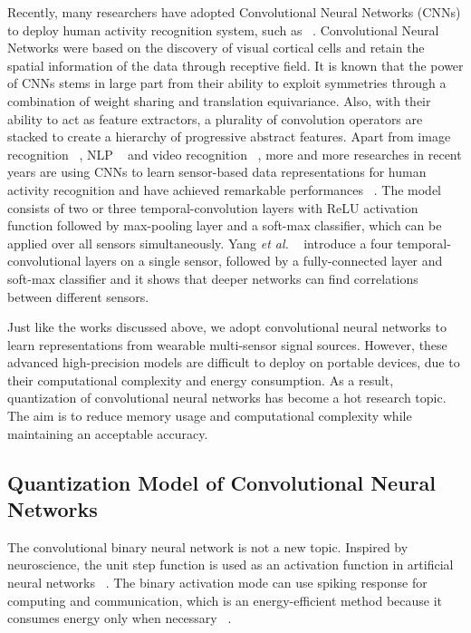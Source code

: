 \documentclass[twoside,twocolumn]{article}
\begin{document}
Recently, many researchers have adopted Convolutional Neural Networks (CNNs) to deploy human activity recognition system, such as ~\cite{b6,b22,b26,b27,b28}. Convolutional Neural Networks were based on the discovery of visual cortical cells and retain the spatial information of the data through receptive field. It is known that the power of CNNs stems in large part from their ability to exploit symmetries through a combination of weight sharing and translation equivariance. Also, with their ability to act as feature extractors, a plurality of convolution operators are stacked to create a hierarchy of progressive abstract features. Apart from image recognition ~\cite{b12,b29,b30}, NLP ~\cite{b31,b32} and video recognition ~\cite{b33}, more and more researches in recent years are using CNNs to learn sensor-based data representations for human activity recognition and have achieved remarkable performances ~\cite{b6,b34}. The model ~\cite{b28} consists of two or three temporal-convolution layers with ReLU activation function followed by max-pooling layer and a soft-max classifier, which can be applied over all sensors simultaneously. Yang \emph{et al.} ~\cite{b6} introduce a four temporal-convolutional layers on a single sensor, followed by a fully-connected layer and soft-max classifier and it shows that deeper networks can find correlations between different sensors.

Just like the works discussed above, we adopt convolutional neural networks to learn representations from wearable multi-sensor signal sources. However, these advanced high-precision models are difficult to deploy on portable devices, due to their computational complexity and energy consumption. As a result, quantization of convolutional neural networks has become a hot research topic. The aim is to reduce memory usage and computational complexity while maintaining an acceptable accuracy.



\subsection{Quantization Model of Convolutional Neural Networks}
The convolutional binary neural network is not a new topic. Inspired by neuroscience, the unit step function is used as an activation function in artificial neural networks ~\cite{b35}. The binary activation mode can use spiking response for computing and communication, which is an energy-efficient method because it consumes energy only when necessary ~\cite{b13}.
\end{document}
